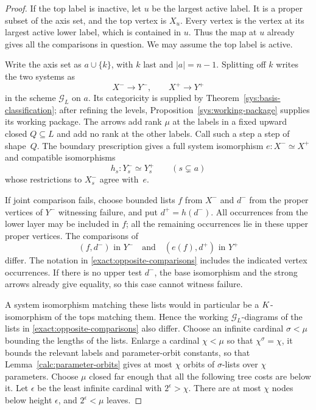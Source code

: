 \begin{proof}
If the top label is inactive, let $u$ be the largest active label.
It is a proper subset of the axis set, and the top vertex is $X_u$.
Every vertex is the vertex at its largest active lower label, which
is contained in $u$.  Thus the map at $u$ already gives all the
comparisons in question.  We may assume the top label is active.

Write the axis set as $a\cup\{k\}$, with $k$ last and $|a|=n-1$.
Splitting off $k$ writes the two systems as
\[
 X^-\longrightarrow Y^- ,\qquad X^+\longrightarrow Y^+
\]
in the scheme $\mathcal G_L$ on $a$.
Its categoricity is supplied by
Theorem~\ref{sys:basis-classification}; after refining the levels,
Proposition~\ref{sys:working-package} supplies its working package.
The arrows add rank $\mu$ at the labels in a fixed upward closed
$Q\subseteq L$ and add no rank at the other labels.  Call such a
step a step of shape~$Q$.  The boundary prescription gives a full
system isomorphism $e:X^-\simeq X^+$ and compatible isomorphisms
\[
 h_s:Y_s^-\simeq Y_s^+\qquad(s\subsetneq a)
\]
whose restrictions to $X_s^-$ agree with~$e$.

If joint comparison fails, choose bounded lists $f$ from $X^-$ and
$d^-$ from the proper vertices of $Y^-$ witnessing failure, and put
$d^+=h(d^-)$.  All occurrences from the lower layer may be included
in $f$; all the remaining occurrences lie in these upper proper
vertices.  The comparisons of
\begin{equation}
 (f,d^-)\text{ in }Y^-
 \quad\text{and}\quad
 (e(f),d^+)\text{ in }Y^+
 \label{exact:opposite-comparisons}
\end{equation}
differ.  The notation in \eqref{exact:opposite-comparisons} includes
the indicated vertex occurrences.  If there is no upper test $d^-$,
the base isomorphism and the strong arrows already give equality,
so this case cannot witness failure.

A system isomorphism matching these lists would in particular be a
$K$-isomorphism of the tops matching them.  Hence the working
$\mathcal G_L$-diagrams of the lists in
\eqref{exact:opposite-comparisons} also differ.  Choose an infinite
cardinal $\sigma<\mu$ bounding the lengths of the lists.  Enlarge a
cardinal $\chi<\mu$ so that $\chi^\sigma=\chi$, it bounds the
relevant labels and parameter-orbit constants, so that
Lemma~\ref{calc:parameter-orbits} gives at most $\chi$ orbits of
$\sigma$-lists over $\chi$ parameters.  Choose $\mu$ closed far enough that all
the following tree costs are below it.  Let $\epsilon$ be the least
infinite cardinal with $2^\epsilon>\chi$.  There are at most $\chi$
nodes below height $\epsilon$, and $2^\epsilon<\mu$ leaves.


\end{proof}
